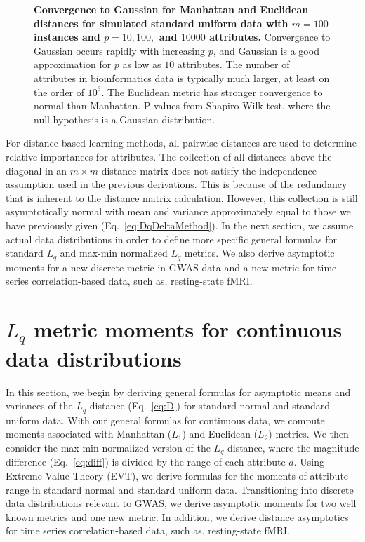 \documentclass[10pt,letterpaper]{article}
\begin{document}
\begin{figure}[H]
	\centering
	\caption{{\bf Convergence to Gaussian for Manhattan and Euclidean distances for simulated standard uniform data with $m=100$ instances and $p=10, 100,$ and $10000$ attributes.} Convergence to Gaussian occurs rapidly with increasing $p$, and Gaussian is a good approximation for $p$ as low as $10$ attributes. The number of attributes in bioinformatics data is typically much larger, at least on the order of $10^3$. The Euclidean metric has stronger convergence to normal than Manhattan.  P values from Shapiro-Wilk test, where the null hypothesis is a Gaussian distribution.}
	\label{fig:central_limit_convergence}
\end{figure}

For distance based learning methods, all pairwise distances are used to determine relative importances for attributes. The collection of all distances above the diagonal in an $m \times m$ distance matrix does not satisfy the independence assumption used in the previous derivations. This is because of the redundancy that is inherent to the distance matrix calculation. However, this collection is still asymptotically normal with mean and variance approximately equal to those we have previously given (Eq.~\ref{eq:DqDeltaMethod}). In the next section, we assume actual data distributions in order to define more specific general formulas for standard $L_q$ and max-min normalized $L_q$ metrics. We also derive asymptotic moments for a new discrete metric in GWAS data and a new metric for time series correlation-based data, such as, resting-state fMRI. 

\section{\texorpdfstring{$L_q$}{} metric moments for continuous data distributions}\label{sec:moment_derivations}

In this section, we begin by deriving general formulas for asymptotic means and variances of the $L_q$ distance (Eq.~\ref{eq:D}) for standard normal and standard uniform data. With our general formulas for continuous data, we compute moments associated with Manhattan ($L_1$) and Euclidean ($L_2$) metrics. We then consider the max-min normalized version of the $L_q$ distance, where the magnitude difference (Eq.~\ref{eq:diff}) is divided by the range of each attribute $a$. Using Extreme Value Theory (EVT), we derive formulas for the moments of attribute range in standard normal and standard uniform data. Transitioning into discrete data distributions relevant to GWAS, we derive asymptotic moments for two well known metrics and one new metric. In addition, we derive distance asymptotics for time series correlation-based data, such as, resting-state fMRI.  
\end{document}
